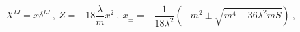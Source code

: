 \begin{equation}
X^{IJ} = x \delta^{IJ} ~,~ Z = -18 \frac{\lambda}{m} x^2
~,~ x_\pm = - \frac{1}{18 \lambda^2} \left( -m^2 \pm
\sqrt{m^4 - 36 \lambda^2 m S} \right) ~,
\end{equation}

